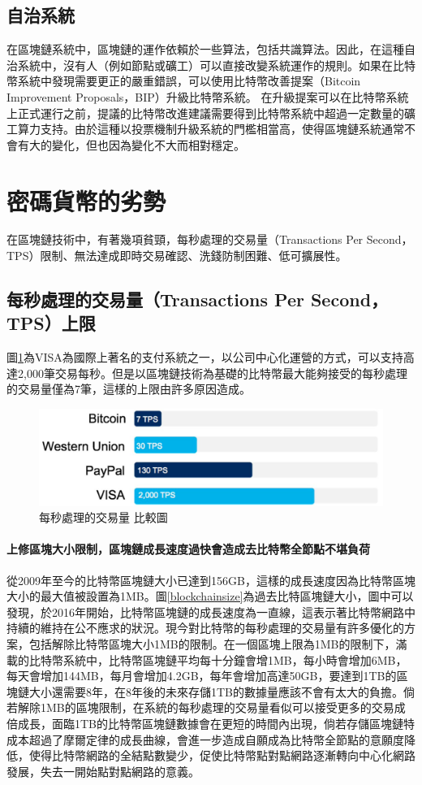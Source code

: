 		\subsection{自治系統}
		在區塊鏈系統中，區塊鏈的運作依賴於一些算法，包括共識算法。因此，在這種自治系統中，沒有人（例如節點或礦工）可以直接改變系統運作的規則。如果在比特幣系統中發現需要更正的嚴重錯誤，可以使用比特幣改善提案（Bitcoin Improvement Proposals，BIP）升級比特幣系統。 在升級提案可以在比特幣系統上正式運行之前，提議的比特幣改進建議需要得到比特幣系統中超過一定數量的礦工算力支持。由於這種以投票機制升級系統的門檻相當高，使得區塊鏈系統通常不會有大的變化，但也因為變化不大而相對穩定。

	\section{密碼貨幣的劣勢}
	在區塊鏈技術中，有著幾項貧頸，每秒處理的交易量（Transactions Per Second，TPS）限制、無法達成即時交易確認、洗錢防制困難、低可擴展性。

		\subsection{每秒處理的交易量（Transactions Per Second，TPS）上限}
		圖\ref{TPS}為VISA為國際上著名的支付系統之一，以公司中心化運營的方式，可以支持高達2,000筆交易每秒。但是以區塊鏈技術為基礎的比特幣最大能夠接受的每秒處理的交易量僅為7筆，這樣的上限由許多原因造成。

			\begin{figure}[h]
				\centering
				\includegraphics[width = .7\textwidth]{TPS.png}
				\caption{每秒處理的交易量 比較圖\supercite{TPS}}\label{TPS}
			\end{figure}

			\paragraph{上修區塊大小限制，區塊鏈成長速度過快會造成去比特幣全節點不堪負荷}
			從2009年至今的比特幣區塊鏈大小已達到156GB，這樣的成長速度因為比特幣區塊大小的最大值被設置為1MB。圖\ref{blockchainsize}為過去比特區塊鏈大小，圖中可以發現，於2016年開始，比特幣區塊鏈的成長速度為一直線，這表示著比特幣網路中持續的維持在公不應求的狀況。現今對比特幣的每秒處理的交易量有許多優化的方案，包括解除比特幣區塊大小1MB的限制。在一個區塊上限為1MB的限制下，滿載的比特幣系統中，比特幣區塊鏈平均每十分鐘會增1MB，每小時會增加6MB，每天會增加144MB，每月會增加4.2GB，每年會增加高達50GB，要達到1TB的區塊鏈大小還需要8年，在8年後的未來存儲1TB的數據量應該不會有太大的負擔。倘若解除1MB的區塊限制，在系統的每秒處理的交易量看似可以接受更多的交易成倍成長，面臨1TB的比特幣區塊鏈數據會在更短的時間內出現，倘若存儲區塊鏈特成本超過了摩爾定律的成長曲線，會進一步造成自願成為比特幣全節點的意願度降低，使得比特幣網路的全結點數變少，促使比特幣點對點網路逐漸轉向中心化網路發展，失去一開始點對點網路的意義。

